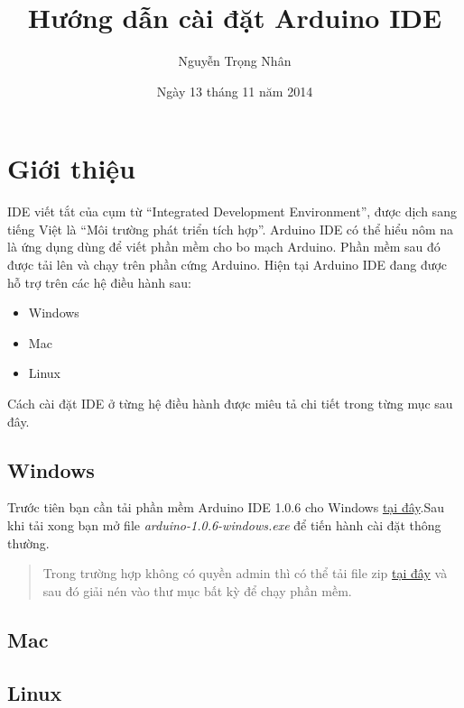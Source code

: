 \documentclass[11pt]{article} %
\title{Hướng dẫn cài đặt Arduino IDE}
\author{Nguyễn Trọng Nhân}
\date{Ngày 13 tháng 11 năm 2014}
\begin{document}
\maketitle

\section{Giới thiệu}
IDE viết tắt của cụm từ ``Integrated Development Environment'', được dịch sang tiếng Việt là ``Môi trường phát triển tích hợp''. Arduino IDE có thể hiểu nôm na là ứng dụng dùng để viết phần mềm cho bo mạch Arduino. Phần mềm sau đó được tải lên và chạy trên phần cứng Arduino.\newline
Hiện tại Arduino IDE đang được hỗ trợ trên các hệ điều hành sau:
\begin{itemize}
\item Windows
\item Mac
\item Linux
\end{itemize}
Cách cài đặt IDE ở từng hệ điều hành được miêu tả chi tiết trong từng mục sau đây.
\subsection{Windows}
Trước tiên bạn cần tải phần mềm Arduino IDE 1.0.6 cho Windows \href{http://arduino.cc/download.php?f=/arduino-1.0.6-windows.exe}{tại đây}.Sau khi tải xong bạn mở file \textit{arduino-1.0.6-windows.exe} để tiến hành cài đặt thông thường.\newline
\begin{quotation}
Trong trường hợp không có quyền admin thì có thể tải file zip \href{http://arduino.cc/download.php?f=/arduino-1.0.6-windows.zip}{tại đây} và sau đó giải nén vào thư mục bất kỳ để chạy phần mềm.
\end{quotation}
\subsection{Mac}


\subsection{Linux}
\end{document}
